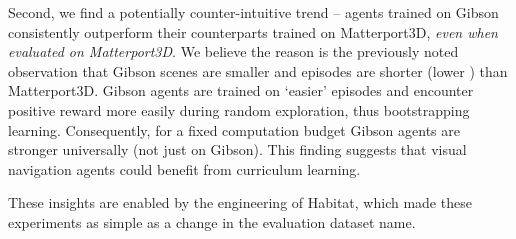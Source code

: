 Second, we find a potentially counter-intuitive trend -- 
agents trained on Gibson consistently outperform their 
counterparts trained on Matterport3D, \emph{even 
when evaluated on Matterport3D}.
We believe the reason is the previously noted observation that 
Gibson scenes are smaller and episodes are shorter 
(lower \gdsp) than Matterport3D. 
Gibson agents are trained on `easier' episodes and 
encounter positive reward more easily during random exploration, 
thus bootstrapping learning. Consequently, for a fixed 
computation budget Gibson agents are stronger universally (not 
just on Gibson). 
This finding suggests that visual navigation agents could 
benefit from curriculum learning. 

These insights are enabled by the engineering of Habitat, which made these experiments as simple as a change in the evaluation dataset name.